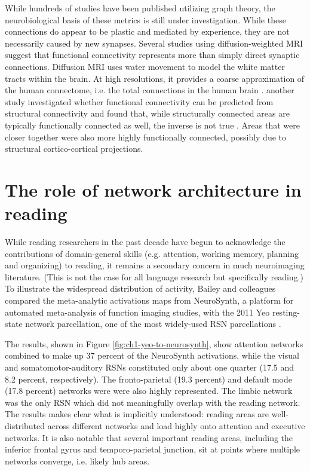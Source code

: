 While hundreds of studies have been published utilizing graph theory, the neurobiological basis of these metrics is still under investigation. While these connections do appear to be plastic and mediated by experience, they are not necessarily caused by new synapses. Several studies using diffusion-weighted MRI suggest that functional connectivity represents more than simply direct synaptic connections. Diffusion MRI uses water movement to model the white matter tracts within the brain. At high resolutions, it provides a coarse approximation of the human connectome, i.e. the total connections in the human brain \citep{Sporns2005}. another study investigated whether functional connectivity can be predicted from structural connectivity and found that, while structurally connected areas are typically functionally connected as well, the inverse is not true \citep{Honey2009}. Areas that were closer together were also more highly functionally connected, possibly due to structural cortico-cortical projections. 


\section{The role of network architecture in reading}

While reading researchers in the past decade have begun to acknowledge the contributions of domain-general skills (e.g. attention, working memory, planning and organizing) to reading, it remains a secondary concern in much neuroimaging literature. (This is not the case for all language research but specifically reading.) To illustrate the widespread distribution of activity, Bailey and colleagues compared the meta-analytic activations maps from NeuroSynth, a platform for automated meta-analysis of function imaging studies, with the 2011 Yeo resting-state network parcellation, one of the most widely-used RSN parcellations \citep{Bailey2018, Yarkoni2008a, Yeo2011}. 

The results, shown in Figure \ref{fig:ch1-yeo-to-neurosynth}, show attention networks combined to make up 37 percent of the NeuroSynth activations, while the visual and somatomotor-auditory RSNs constituted only about one quarter (17.5 and 8.2 percent, respectively). The fronto-parietal (19.3 percent) and default mode (17.8 percent) networks were were also highly represented. The limbic network was the only RSN which did not meaningfully overlap with the reading network. The results makes clear what is implicitly understood: reading areas are well-distributed across different networks and load highly onto attention and executive networks. It is also notable that several important reading areas, including the inferior frontal gyrus and temporo-parietal junction, sit at points where multiple networks converge, i.e. likely hub areas.

